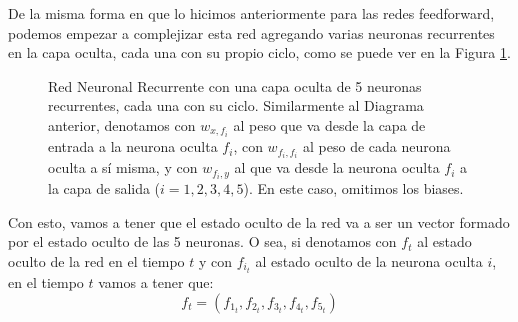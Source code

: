 \documentclass[../../main.tex]{subfiles}
\begin{document}
De la misma forma en que lo hicimos anteriormente para las redes feedforward, podemos
empezar a complejizar esta red agregando varias neuronas recurrentes en la capa oculta,
cada una con su propio ciclo, como se puede ver en la Figura \ref{fig:simple-rnn-2}.
\begin{figure}[h]
    \centering
    \caption{Red Neuronal Recurrente con una capa oculta de 5 neuronas recurrentes, cada
    una con su ciclo. Similarmente al Diagrama anterior, denotamos con \(w_{x,f_i}\) al
    peso que va desde la capa de entrada a la neurona oculta \(f_i\), con \(w_{f_i, f_i}\)
    al peso de cada neurona oculta a sí misma, y con \(w_{f_i, y}\) al que va desde la
    neurona oculta \(f_i\) a la capa de salida (\(i=1,2,3,4,5\)). En este caso, omitimos
    los biases.}
    \label{fig:simple-rnn-2}
\end{figure}

Con esto, vamos a tener que el estado oculto de la red va a ser un vector formado por el
estado oculto de las 5 neuronas. O sea, si denotamos con \(f_t\) al estado oculto
de la red en el tiempo \(t\) y con \(f_{i_t}\) al estado oculto de la neurona oculta
\(i\), en el tiempo \(t\) vamos a tener que:
\begin{equation*}
    f_t = (f_{1_t}, f_{2_t}, f_{3_t}, f_{4_t}, f_{5_t})
\end{equation*}
\end{document}
